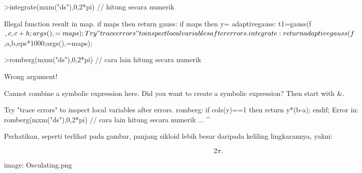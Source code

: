 \documentclass[a4paper,10pt]{article}
\begin{document}
\begin{eulernotebook}
\begin{eulercomment}
\begin{eulercomment}
\begin{eulercomment}
\begin{eulercomment}
\begin{eulercomment}
\begin{eulercomment}
\begin{eulercomment}
\begin{eulercomment}
\begin{eulercomment}
\begin{eulercomment}
\begin{eulercomment}
\begin{eulercomment}
\begin{eulercomment}
\begin{eulercomment}
\begin{eulercomment}
\begin{eulercomment}
\begin{eulercomment}
\begin{eulercomment}
\begin{eulercomment}
\begin{eulercomment}
\begin{eulerprompt}
>integrate(mxm("ds"),0,2*pi) // hitung secara numerik
\end{eulerprompt}
\begin{euleroutput}
  Illegal function result in map.
      if maps then return %
  gauss:
      if maps then y=%
  adaptivegauss:
      t1=gauss(f$,c,c+h;args(),=maps);
  Try "trace errors" to inspect local variables after errors.
  integrate:
      return adaptivegauss(f$,a,b,eps*1000;args(),=maps);
\end{euleroutput}
\begin{eulerprompt}
>romberg(mxm("ds"),0,2*pi) // cara lain hitung secara numerik
\end{eulerprompt}
\begin{euleroutput}
  Wrong argument!
  
  Cannot combine a symbolic expression here.
  Did you want to create a symbolic expression?
  Then start with &.
  
  Try "trace errors" to inspect local variables after errors.
  romberg:
      if cols(y)==1 then return y*(b-a); endif;
  Error in:
  romberg(mxm("ds"),0,2*pi) // cara lain hitung secara numerik ...
                           ^
\end{euleroutput}
\begin{eulercomment}
Perhatikan, seperti terlihat pada gambar, panjang sikloid lebih besar daripada keliling lingkarannya, yakni:

\end{eulercomment}
\begin{eulerformula}
\[
2\pi.
\]
\end{eulerformula}
\begin{eulercomment}
image: Osculating.png


\end{eulercomment}
\end{eulercomment}
\end{eulercomment}
\end{eulercomment}
\end{eulercomment}
\end{eulercomment}
\end{eulercomment}
\end{eulercomment}
\end{eulercomment}
\end{eulercomment}
\end{eulercomment}
\end{eulercomment}
\end{eulercomment}
\end{eulercomment}
\end{eulercomment}
\end{eulercomment}
\end{eulercomment}
\end{eulercomment}
\end{eulercomment}
\end{eulercomment}
\end{eulercomment}
\end{eulernotebook}
\end{document}
